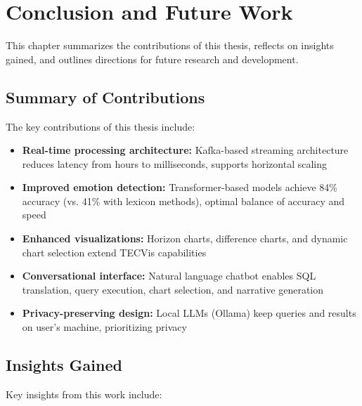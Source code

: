 
\chapter{Conclusion and Future Work}
\label{Chapter7}


This chapter summarizes the contributions of this thesis, reflects on insights gained, and outlines directions for future research and development.


\section{Summary of Contributions}

The key contributions of this thesis include:

\begin{itemize}
\item \textbf{Real-time processing architecture:} Kafka-based streaming architecture reduces latency from hours to milliseconds, supports horizontal scaling
\item \textbf{Improved emotion detection:} Transformer-based models achieve 84\% accuracy (vs. 41\% with lexicon methods), optimal balance of accuracy and speed
\item \textbf{Enhanced visualizations:} Horizon charts, difference charts, and dynamic chart selection extend TECVis capabilities
\item \textbf{Conversational interface:} Natural language chatbot enables SQL translation, query execution, chart selection, and narrative generation
\item \textbf{Privacy-preserving design:} Local LLMs (Ollama) keep queries and results on user's machine, prioritizing privacy
\end{itemize}


\section{Insights Gained}

Key insights from this work include:

